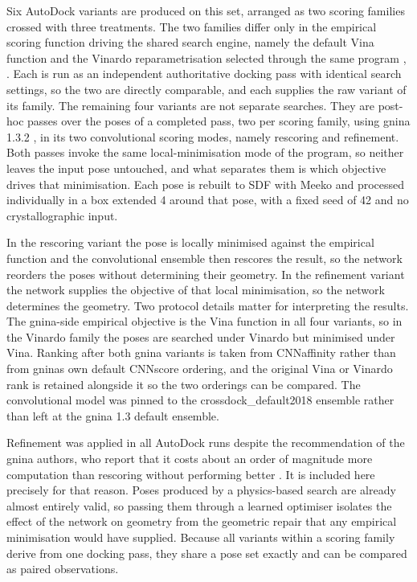 Six AutoDock variants are produced on this set, arranged as two scoring families crossed with three treatments. The two families differ only in the empirical scoring function driving the shared search engine, namely the default Vina function and the Vinardo reparametrisation selected through the same program \cite{ref023}, \cite{ref073}. Each is run as an independent authoritative docking pass with identical search settings, so the two are directly comparable, and each supplies the raw variant of its family. The remaining four variants are not separate searches. They are post-hoc passes over the poses of a completed pass, two per scoring family, using gnina 1.3.2 \cite{ref056}, \cite{ref067} in its two convolutional scoring modes, namely rescoring and refinement. Both passes invoke the same local-minimisation mode of the program, so neither leaves the input pose untouched, and what separates them is which objective drives that minimisation. Each pose is rebuilt to SDF with Meeko and processed individually in a box extended 4 \angstrom{} around that pose, with a fixed seed of 42 and no crystallographic input.

In the rescoring variant the pose is locally minimised against the empirical function and the convolutional ensemble then rescores the result, so the network reorders the poses without determining their geometry. In the refinement variant the network supplies the objective of that local minimisation, so the network determines the geometry. Two protocol details matter for interpreting the results. The gnina-side empirical objective is the Vina function in all four variants, so in the Vinardo family the poses are searched under Vinardo but minimised under Vina. Ranking after both gnina variants is taken from CNNaffinity rather than from gnina\textquotesingle s own default CNNscore ordering, and the original Vina or Vinardo rank is retained alongside it so the two orderings can be compared. The convolutional model was pinned to the crossdock\_default2018 ensemble rather than left at the gnina 1.3 default ensemble.

Refinement was applied in all AutoDock runs despite the recommendation of the gnina authors, who report that it costs about an order of magnitude more computation than rescoring without performing better \cite{ref056}. It is included here precisely for that reason. Poses produced by a physics-based search are already almost entirely valid, so passing them through a learned optimiser isolates the effect of the network on geometry from the geometric repair that any empirical minimisation would have supplied. Because all variants within a scoring family derive from one docking pass, they share a pose set exactly and can be compared as paired observations.


